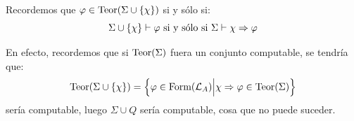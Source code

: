\documentclass[12pt]{report}
\theoremstyle{largebreak}
\begin{document}
    \begin{obs}
        Recordemos que $\varphi\in\textup{Teor}(\Sigma\cup\left\{\chi\right\})$ si y sólo si:
        \begin{equation*}
            \Sigma\cup\left\{\chi \right\}\vdash\varphi\textup{ si y sólo si }\Sigma\vdash\chi\Rightarrow\varphi
        \end{equation*}
    \end{obs}
    
    En efecto, recordemos que si $\textup{Teor}(\Sigma)$ fuera un conjunto computable, se tendría que:
    \begin{equation*}
        \textup{Teor}(\Sigma\cup\left\{\chi\right\})=\left\{\varphi\in\textup{Form}(\mathcal{L}_A)\Big|\chi\Rightarrow\varphi\in\textup{Teor}(\Sigma) \right\}
    \end{equation*}
    sería computable, luego $\Sigma\cup Q$ sería computable, cosa que no puede suceder.
\end{document}
